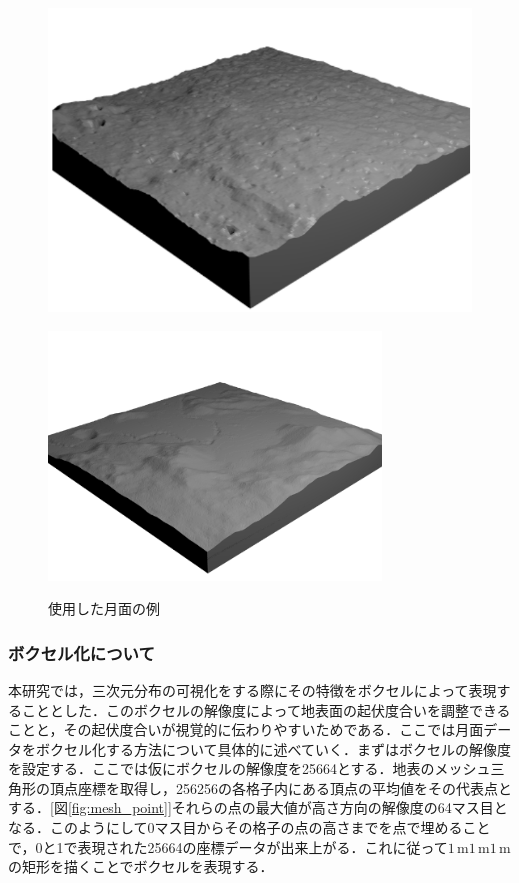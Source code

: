 \documentclass[uplatex,twocolumn, dvipdfmx]{jsarticle}  %
\begin{document}
\begin{figure}[b]
  \centering
  \begin{minipage}[b]{0.48\linewidth}
    \centering
    \includegraphics[keepaspectratio, scale=0.15]{images/NASA_moon.png}
    \label{fig:NASA_moon}
  \end{minipage}
  \begin{minipage}[b]{0.48\linewidth}
    \centering
    \includegraphics[keepaspectratio, scale=0.3]{images/NASA_moon2.png}
    \label{fig:NASA_moon2}
  \end{minipage}
  \caption{使用した月面の例}\label{fig:NASA_moons}
\end{figure}



\subsubsection{ボクセル化について}
本研究では，三次元分布の可視化をする際にその特徴をボクセルによって表現することとした．このボクセルの解像度によって地表面の起伏度合いを調整できることと，その起伏度合いが視覚的に伝わりやすいためである．ここでは月面データをボクセル化する方法について具体的に述べていく．まずはボクセルの解像度を設定する．ここでは仮にボクセルの解像度を256\times64とする．地表のメッシュ三角形の頂点座標を取得し，256\times256の各格子内にある頂点の平均値をその代表点とする．[図\ref{fig:mesh_point}]それらの点の最大値が高さ方向の解像度の64マス目となる．このようにして0マス目からその格子の点の高さまでを点で埋めることで，0と1で表現された256\times64の座標データが出来上がる．これに従って$1\mathrm{\,m}$\times$1\mathrm{\,m}$\times$1\mathrm{\,m}$の矩形を描くことでボクセルを表現する．
\end{document}
